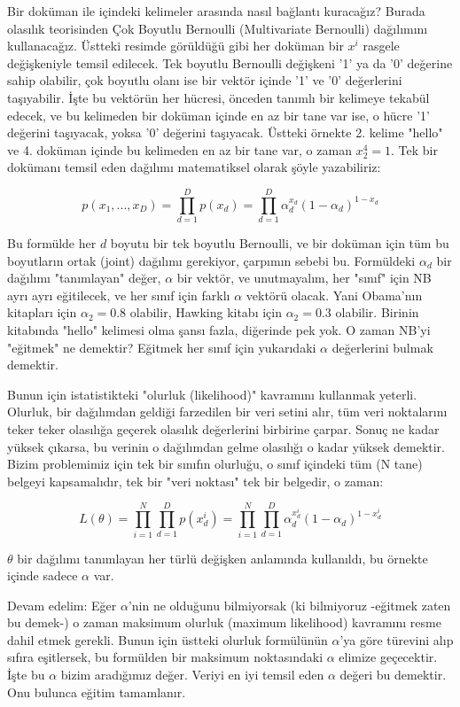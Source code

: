 \documentclass[12pt,fleqn]{article}\usepackage{../../common}
\begin{document}
Bir doküman ile içindeki kelimeler arasında nasıl bağlantı kuracağız?
Burada olasılık teorisinden Çok Boyutlu Bernoulli (Multivariate Bernoulli)
dağılımını kullanacağız. Üstteki resimde görüldüğü gibi her doküman bir
$x^i$ rasgele değişkeniyle temsil edilecek. Tek boyutlu Bernoulli değişkeni
'1' ya da '0' değerine sahip olabilir, çok boyutlu olanı ise bir vektör
içinde '1' ve '0' değerlerini taşıyabilir. İşte bu vektörün her hücresi,
önceden tanımlı bir kelimeye tekabül edecek, ve bu kelimeden bir doküman
içinde en az bir tane var ise, o hücre '1' değerini taşıyacak, yoksa '0'
değerini taşıyacak. Üstteki örnekte 2. kelime "hello" ve 4. doküman
içinde bu kelimeden en az bir tane var, o zaman $x_2^4 = 1$. Tek bir
dokümanı temsil eden dağılımı matematiksel olarak şöyle yazabiliriz:

$$ p(x_1,...,x_{D}) = \prod_{d=1}^{D} p(x_d)=\prod_{d=1}^{D}
\alpha_d^{x_d}(1-\alpha_d)^{1-x_d} 
$$

Bu formülde her $d$ boyutu bir tek boyutlu Bernoulli, ve bir doküman
için tüm bu boyutların ortak (joint) dağılımı gerekiyor, çarpımın
sebebi bu. Formüldeki $\alpha_d$ bir dağılımı "tanımlayan" değer,
$\alpha$ bir vektör, ve unutmayalım, her "sınıf" için NB ayrı ayrı
eğitilecek, ve her sınıf için farklı $\alpha$ vektörü olacak. Yani
Obama'nın kitapları için $\alpha_2 = 0.8$ olabilir, Hawking kitabı
için $\alpha_2 = 0.3$ olabilir. Birinin kitabında "hello" kelimesi
olma şansı fazla, diğerinde pek yok. O zaman NB'yi "eğitmek" ne
demektir? Eğitmek her sınıf için yukarıdaki $\alpha$ değerlerini
bulmak demektir.

Bunun için istatistikteki "olurluk (likelihood)" kavramını kullanmak
yeterli. Olurluk, bir dağılımdan geldiği farzedilen bir veri setini
alır, tüm veri noktalarını teker teker olasılığa geçerek olasılık
değerlerini birbirine çarpar. Sonuç ne kadar yüksek çıkarsa, bu
verinin o dağılımdan gelme olasılığı o kadar yüksek demektir. Bizim
problemimiz için tek bir sınıfın olurluğu, o sınıf içindeki tüm (N
tane) belgeyi kapsamalıdır, tek bir "veri noktası" tek bir belgedir,
o zaman:

$$ L(\theta) = \prod_{i=1}^N \prod_{d=1}^{D} p(x_d^i) = 
\prod_{i=1}^N \prod_{d=1}^{D} \alpha_d^{x_d^i}(1-\alpha_d)^{1-x_d^i}
 $$

$\theta$ bir dağılımı tanımlayan her türlü değişken anlamında kullanıldı, bu
örnekte içinde sadece $\alpha$ var.

Devam edelim: Eğer $\alpha$'nin ne olduğunu bilmiyorsak (ki bilmiyoruz
-eğitmek zaten bu demek-) o zaman maksimum olurluk (maximum likelihood)
kavramını resme dahil etmek gerekli. Bunun için üstteki olurluk formülünün
$\alpha$'ya göre türevini alıp sıfıra eşitlersek, bu formülden bir maksimum
noktasındaki $\alpha$ elimize geçecektir. İşte bu $\alpha$ bizim aradığımız
değer. Veriyi en iyi temsil eden $\alpha$ değeri bu demektir. Onu bulunca
eğitim tamamlanır.
\end{document}
